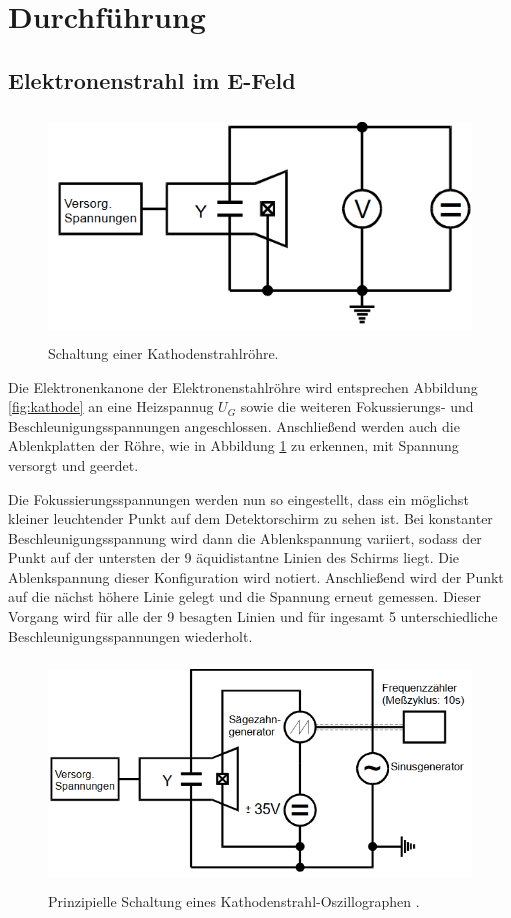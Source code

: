 \section{Durchführung}
\label{sec:Durchführung}

\subsection{Elektronenstrahl im E-Feld}
\begin{figure}[H]
  \centering
  \includegraphics[height=6cm]{Elektronenstrahlroehre_Schaltung.PNG}
  \caption{Schaltung einer Kathodenstrahlröhre. \cite{sample}}
  \label{fig:Schaltung}
\end{figure}

Die Elektronenkanone der Elektronenstahlröhre wird entsprechen Abbildung \ref{fig:kathode}
an eine Heizspannug $U_G$ sowie die weiteren Fokussierungs- und Beschleunigungsspannungen angeschlossen.
Anschließend werden auch die Ablenkplatten der Röhre, wie in Abbildung \ref{fig:Schaltung} zu erkennen, mit Spannung
versorgt und geerdet. 

Die Fokussierungsspannungen werden nun so eingestellt, dass ein möglichst kleiner leuchtender Punkt auf dem
Detektorschirm zu sehen ist. Bei konstanter Beschleunigungsspannung wird dann die Ablenkspannung variiert, sodass
der Punkt auf der untersten der 9 äquidistantne Linien des Schirms liegt. Die Ablenkspannung dieser Konfiguration wird
notiert. Anschließend wird der Punkt auf die nächst höhere Linie gelegt und die Spannung erneut gemessen.
Dieser Vorgang wird für alle der 9 besagten Linien und für ingesamt 5 unterschiedliche Beschleunigungsspannungen wiederholt.

\begin{figure}[H]
  \centering
  \includegraphics[height=6cm]{Oszilloskop_Schaltung.PNG}
  \caption{Prinzipielle Schaltung eines Kathodenstrahl-Oszillographen . \cite{sample}}
  \label{fig:Schaltung1}
\end{figure}

